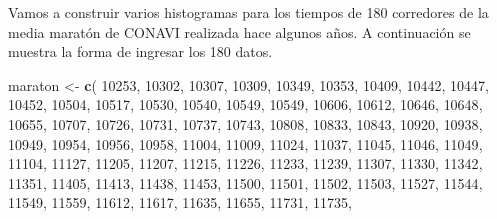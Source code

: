 \documentclass[10pt,]{krantz}
\makeatletter
\newenvironment{Shaded}{\begin{snugshade}}{\end{snugshade}}
\newcommand{\KeywordTok}[1]{\textcolor[rgb]{0.13,0.29,0.53}{\textbf{#1}}}
\newcommand{\DecValTok}[1]{\textcolor[rgb]{0.00,0.00,0.81}{#1}}
\newcommand{\StringTok}[1]{\textcolor[rgb]{0.31,0.60,0.02}{#1}}
\newcommand{\NormalTok}[1]{#1}
\newenvironment{kframe}{%
\medskip{}
\setlength{\fboxsep}{.8em}
 \def\at@end@of@kframe{}%
 \ifinner\ifhmode%
  \def\at@end@of@kframe{\end{minipage}}%
  \begin{minipage}{\columnwidth}%
 \fi\fi%
 \def\FrameCommand##1{\hskip\@totalleftmargin \hskip-\fboxsep
 \colorbox{shadecolor}{##1}\hskip-\fboxsep
     \hskip-\linewidth \hskip-\@totalleftmargin \hskip\columnwidth}%
 \MakeFramed {\advance\hsize-\width
   \@totalleftmargin\z@ \linewidth\hsize
   \@setminipage}}%
 {\par\unskip\endMakeFramed%
 \at@end@of@kframe}
\renewenvironment{Shaded}{\begin{kframe}}{\end{kframe}}
\makeatother
\begin{document}
Vamos a construir varios histogramas para los tiempos de 180 corredores
de la media maratón de CONAVI realizada hace algunos años. A
continuación se muestra la forma de ingresar los 180 datos.

\begin{Shaded}
\begin{Highlighting}[]
\NormalTok{maraton <-}\StringTok{ }\KeywordTok{c}\NormalTok{(}
\DecValTok{10253}\NormalTok{, }\DecValTok{10302}\NormalTok{, }\DecValTok{10307}\NormalTok{, }\DecValTok{10309}\NormalTok{, }\DecValTok{10349}\NormalTok{, }\DecValTok{10353}\NormalTok{, }\DecValTok{10409}\NormalTok{, }\DecValTok{10442}\NormalTok{, }\DecValTok{10447}\NormalTok{, }
\DecValTok{10452}\NormalTok{, }\DecValTok{10504}\NormalTok{, }\DecValTok{10517}\NormalTok{, }\DecValTok{10530}\NormalTok{, }\DecValTok{10540}\NormalTok{, }\DecValTok{10549}\NormalTok{, }\DecValTok{10549}\NormalTok{, }\DecValTok{10606}\NormalTok{, }\DecValTok{10612}\NormalTok{, }
\DecValTok{10646}\NormalTok{, }\DecValTok{10648}\NormalTok{, }\DecValTok{10655}\NormalTok{, }\DecValTok{10707}\NormalTok{, }\DecValTok{10726}\NormalTok{, }\DecValTok{10731}\NormalTok{, }\DecValTok{10737}\NormalTok{, }\DecValTok{10743}\NormalTok{, }\DecValTok{10808}\NormalTok{, }
\DecValTok{10833}\NormalTok{, }\DecValTok{10843}\NormalTok{, }\DecValTok{10920}\NormalTok{, }\DecValTok{10938}\NormalTok{, }\DecValTok{10949}\NormalTok{, }\DecValTok{10954}\NormalTok{, }\DecValTok{10956}\NormalTok{, }\DecValTok{10958}\NormalTok{, }\DecValTok{11004}\NormalTok{, }
\DecValTok{11009}\NormalTok{, }\DecValTok{11024}\NormalTok{, }\DecValTok{11037}\NormalTok{, }\DecValTok{11045}\NormalTok{, }\DecValTok{11046}\NormalTok{, }\DecValTok{11049}\NormalTok{, }\DecValTok{11104}\NormalTok{, }\DecValTok{11127}\NormalTok{, }\DecValTok{11205}\NormalTok{, }
\DecValTok{11207}\NormalTok{, }\DecValTok{11215}\NormalTok{, }\DecValTok{11226}\NormalTok{, }\DecValTok{11233}\NormalTok{, }\DecValTok{11239}\NormalTok{, }\DecValTok{11307}\NormalTok{, }\DecValTok{11330}\NormalTok{, }\DecValTok{11342}\NormalTok{, }\DecValTok{11351}\NormalTok{, }
\DecValTok{11405}\NormalTok{, }\DecValTok{11413}\NormalTok{, }\DecValTok{11438}\NormalTok{, }\DecValTok{11453}\NormalTok{, }\DecValTok{11500}\NormalTok{, }\DecValTok{11501}\NormalTok{, }\DecValTok{11502}\NormalTok{, }\DecValTok{11503}\NormalTok{, }\DecValTok{11527}\NormalTok{, }
\DecValTok{11544}\NormalTok{, }\DecValTok{11549}\NormalTok{, }\DecValTok{11559}\NormalTok{, }\DecValTok{11612}\NormalTok{, }\DecValTok{11617}\NormalTok{, }\DecValTok{11635}\NormalTok{, }\DecValTok{11655}\NormalTok{, }\DecValTok{11731}\NormalTok{, }\DecValTok{11735}\NormalTok{,}

\end{Highlighting}
\end{Shaded}
\end{document}
